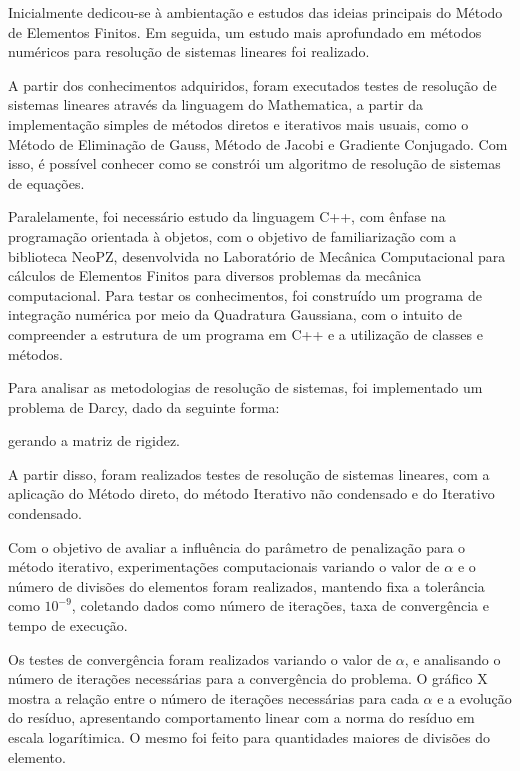 \documentclass[12pt]{article}
\begin{document}
Inicialmente dedicou-se à ambientação e estudos das ideias principais do Método de Elementos Finitos. Em seguida, um estudo mais aprofundado em 
métodos numéricos para resolução de sistemas lineares foi realizado. 

A partir dos conhecimentos adquiridos, foram executados testes de resolução de sistemas lineares através da linguagem do Mathematica, a partir da 
implementação simples de métodos diretos e iterativos mais usuais, como o Método de Eliminação de Gauss, Método de Jacobi e Gradiente Conjugado. 
Com isso, é possível conhecer como se constrói um algoritmo de resolução de sistemas de equações.

Paralelamente, foi necessário estudo da linguagem C++, com ênfase na programação orientada à objetos, com o objetivo de familiarização 
com a biblioteca NeoPZ, desenvolvida no Laboratório de Mecânica Computacional para cálculos de Elementos Finitos para diversos problemas 
da mecânica computacional. Para testar os conhecimentos, foi construído um programa de integração numérica por meio da Quadratura Gaussiana, 
com o intuito de compreender a estrutura de um programa em C++ e a utilização de classes e métodos. 

Para analisar as metodologias de resolução de sistemas, foi implementado um problema de Darcy, dado da seguinte forma:


gerando a matriz de rigidez. 

A partir disso, foram realizados testes de resolução de sistemas lineares, com a aplicação do Método direto, do método Iterativo não 
condensado e do Iterativo condensado.

Com o objetivo de avaliar a influência do parâmetro de penalização para o método iterativo, experimentações computacionais 
variando o valor de \(\alpha\) e o número de divisões do elementos foram realizados, mantendo fixa a tolerância	como \(10^{-9}\), 
coletando dados como número de iterações, taxa de convergência e tempo de execução.



Os testes de convergência foram realizados variando o valor de \(\alpha\), e analisando o número de iterações necessárias para a convergência do
problema. O gráfico X mostra a relação entre o número de iterações necessárias para cada \(\alpha\) e a evolução do resíduo, apresentando 
comportamento linear com a norma do resíduo em escala logarítimica. O mesmo foi feito para quantidades maiores de divisões do elemento.
\end{document}
